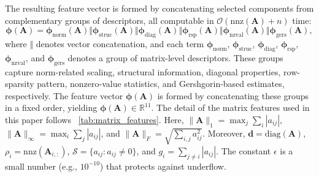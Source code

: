 \documentclass[11pt,a4paper]{article}
\theoremstyle{plain}
\theoremstyle{definition}
\theoremstyle{remark}
\begin{document}
The resulting feature vector is formed by concatenating selected components from complementary groups of descriptors, all computable in $\mathcal{O}(\mathrm{nnz}(\mathbf{A}) + n)$ time:
\begin{equation}\label{eq:phi_concat}
\bm{\phi}(\mathbf{A}) 
= \bm{\phi}_{\mathrm{norm}}(\mathbf{A}) \Vert 
\bm{\phi}_{\mathrm{struc}}(\mathbf{A}) \Vert 
\bm{\phi}_{\mathrm{diag}}(\mathbf{A}) \Vert 
\bm{\phi}_{\mathrm{rsp}}(\mathbf{A}) \Vert 
\bm{\phi}_{\mathrm{nzval}}(\mathbf{A}) \Vert 
\bm{\phi}_{\mathrm{gers}}(\mathbf{A}),
\end{equation}
where $\Vert$ denotes vector concatenation, and each term $\bm{\phi}_{\mathrm{norm}}$, $\bm{\phi}_{\mathrm{struc}}$, $\bm{\phi}_{\mathrm{diag}}$, $\bm{\phi}_{\mathrm{rsp}}$, $\bm{\phi}_{\mathrm{nzval}}$, and $\bm{\phi}_{\mathrm{gers}}$ denotes a group of matrix-level descriptors. These groups capture norm-related scaling, structural information, diagonal properties, row-sparsity pattern, nonzero-value statistics, and Gershgorin-based estimates, respectively. The feature vector $\bm{\phi}(\mathbf{A})$ is formed by concatenating these groups in a fixed order, yielding $\bm{\phi}(\mathbf{A}) \in \mathbb{R}^{11}$. The detail of the matrix features used in this paper follows \tablename~\ref{tab:matrix_features}. Here, $\|\mathbf{A}\|_1 = \max_j \sum_i |a_{ij}|$,
$\|\mathbf{A}\|_\infty = \max_i \sum_j |a_{ij}|$, and
$\|\mathbf{A}\|_F = \sqrt{\sum_{i,j} a_{ij}^2}$.
Moreover, $\mathbf{d} = \mathrm{diag}(\mathbf{A})$,
$\rho_i = \mathrm{nnz}(\mathbf{A}_{i,:})$,
$\mathcal{S} = \{a_{ij} : a_{ij} \neq 0\}$, and
$g_i = \sum_{j \neq i} |a_{ij}|$.
The constant $\epsilon$ is a small number (e.g., $10^{-10}$) that protects against underflow.
\end{document}
